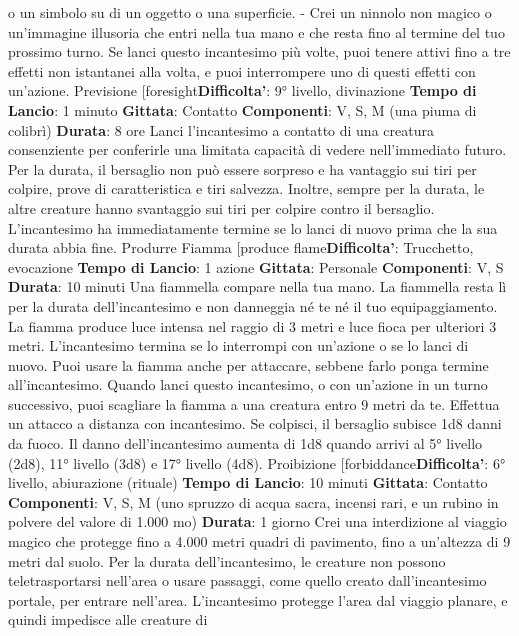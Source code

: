 \begin{multicols}{2}
o un simbolo su di un oggetto o una superficie.
- Crei un ninnolo non magico o un’immagine illusoria
che entri nella tua mano e che resta fino al termine
del tuo prossimo turno.
Se lanci questo incantesimo più volte, puoi tenere attivi
fino a tre effetti non istantanei alla volta, e puoi
interrompere uno di questi effetti con un’azione.
Previsione
[foresight\textbf{Difficolta'}:
9° livello, divinazione
\textbf{Tempo di Lancio}: 1 minuto
\textbf{Gittata}: Contatto
\textbf{Componenti}: V, S, M (una piuma di colibrì)
\textbf{Durata}: 8 ore
Lanci l’incantesimo a contatto di una creatura
consenziente per conferirle una limitata capacità di
vedere nell’immediato futuro. Per la durata, il bersaglio
non può essere sorpreso e ha vantaggio sui tiri per
colpire, prove di caratteristica e tiri salvezza. Inoltre,
sempre per la durata, le altre creature hanno
svantaggio sui tiri per colpire contro il bersaglio.
L’incantesimo ha immediatamente termine se lo lanci di
nuovo prima che la sua durata abbia fine.
Produrre Fiamma
[produce flame\textbf{Difficolta'}:
Trucchetto, evocazione
\textbf{Tempo di Lancio}: 1 azione
\textbf{Gittata}: Personale
\textbf{Componenti}: V, S
\textbf{Durata}: 10 minuti
Una fiammella compare nella tua mano. La fiammella
resta lì per la durata dell’incantesimo e non danneggia
né te né il tuo equipaggiamento. La fiamma produce
luce intensa nel raggio di 3 metri e luce fioca per
ulteriori 3 metri. L’incantesimo termina se lo interrompi
con un’azione o se lo lanci di nuovo.
Puoi usare la fiamma anche per attaccare, sebbene
farlo ponga termine all’incantesimo. Quando lanci
questo incantesimo, o con un’azione in un turno
successivo, puoi scagliare la fiamma a una creatura
entro 9 metri da te. Effettua un attacco a distanza con
incantesimo. Se colpisci, il bersaglio subisce 1d8 danni
da fuoco.
Il danno dell’incantesimo aumenta di 1d8 quando arrivi
al 5° livello (2d8), 11° livello (3d8) e 17° livello (4d8).
Proibizione
[forbiddance\textbf{Difficolta'}:
6° livello, abiurazione (rituale)
\textbf{Tempo di Lancio}: 10 minuti
\textbf{Gittata}: Contatto
\textbf{Componenti}: V, S, M (uno spruzzo di acqua sacra,
incensi rari, e un rubino in polvere del valore di 1.000
mo)
\textbf{Durata}: 1 giorno
Crei una interdizione al viaggio magico che protegge
fino a 4.000 metri quadri di pavimento, fino a un’altezza
di 9 metri dal suolo. Per la durata dell’incantesimo, le
creature non possono teletrasportarsi nell’area o usare
passaggi, come quello creato dall’incantesimo portale,
per entrare nell’area. L’incantesimo protegge l’area dal
viaggio planare, e quindi impedisce alle creature di

\end{multicols}
